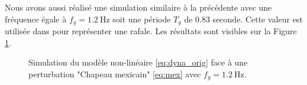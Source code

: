 Nous avons aussi réalisé une simulation similaire à la précédente avec une fréquence égale à $f_g = \SI{1.2}{\Hz}$ soit une période $T_g$ de 0.83 seconde. Cette valeur est utilisée dans \cite{Gillebaart2014} pour représenter une rafale. Les résultats sont visibles sur la Figure \ref{fig:sim_mex1_2}.
\begin{figure}[h]
    \centering
    \caption{Simulation du modèle non-linéaire \eqref{eq:dyna_orig} face à une perturbation "Chapeau mexicain" \eqref{eq:mex} avec $f_g = \SI{1.2}{\Hz}$.}
    \label{fig:sim_mex1_2}
\end{figure}


